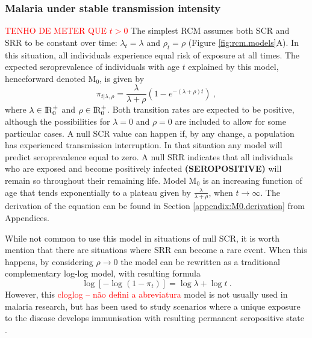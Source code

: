 \subsubsection{Malaria under stable transmission intensity}

\textcolor{red}{TENHO DE METER QUE $t>0$}
The simplest RCM assumes both SCR and SRR to be constant over time: $\lambda_t =\lambda$ and $\rho_t = \rho$ (Figure \ref{fig:rcm.models}A).
In this situation, all individuals experience equal risk of exposure at all times.
The expected seroprevalence of individuals with age $t$ explained by this model, henceforward denoted M$_0$, is given by
%
\begin{equation}
    \label{eq:M0}
    \pi_{t|\lambda, \rho}=\frac{\lambda}{\lambda+\rho}\left(1-e^{-(\lambda+\rho)t}\right)\ ,
\end{equation}
%
\noindent
where $\lambda \in \rm I\!R_{0}^{+}$ and $\rho \in \rm I\!R_{0}^{+}$.
Both transition rates are expected to be positive, although the possibilities for $\lambda=0$ and $\rho=0$ are included to allow for some particular cases.
A null SCR value can happen if, by any change, a population has experienced transmission interruption.
In that situation any model will predict seroprevalence equal to zero.
A null SRR indicates that all individuals who are exposed and become positively infected \textbf{(SEROPOSITIVE)} will remain so throughout their remaining life.
Model M$_0$ is an increasing function of age that tends exponentially to a plateau given by $\textstyle\frac{\lambda}{\lambda+\rho}$, when $t\rightarrow\infty$.
The derivation of the equation can be found in Section \ref{appendix:M0.derivation} from Appendices.

While not common to use this model in situations of null SCR, it is worth mention that there are situations where SRR can become a rare event.
When this happens, by considering $\rho\rightarrow0$ the model can be rewritten as a traditional complementary log-log model, with resulting formula
%
\begin{equation}
    \label{eq:rcm.cloglog}
    \log[-\log(1-\pi_t)]=\log\lambda+\log t\ .
\end{equation}
%
\noindent
However, this \textcolor{red}{cloglog -- não defini a abreviatura} model is not usually used in malaria research, but has been used to study scenarios where a unique exposure to the disease develops immunisation with resulting permanent seropositive state \cite{hens2012modeling}.

